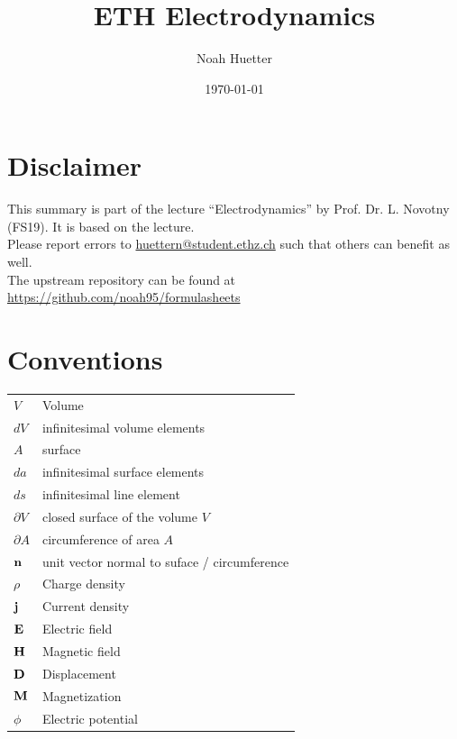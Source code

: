 \documentclass[a4paper, fontsize=8pt, landscape, DIV=1]{scrartcl}
\title{ETH Electrodynamics}
\author{Noah Huetter}
\date{\today}
\begin{document}
\setcounter{secnumdepth}{2} %
\begin{multicols*}{4}
	\section*{Disclaimer}
	This summary is part of the lecture ``Electrodynamics'' by Prof. Dr. L. Novotny (FS19). It is based on the lecture. \\[6pt]
	Please report errors to \href{mailto:huettern@student.ethz.ch}{huettern@student.ethz.ch} such that others can benefit as well.\\[6pt]	
  The upstream repository can be found at \href{https://github.com/noah95/formulasheets}{https://github.com/noah95/formulasheets}
	\vfill\null
	\pagebreak
  \maketitle 
  \thispagestyle{fancy}

  \section{Conventions}
  \begin{tabular}[h]{l l}
    $V$ & Volume \\
    $dV$ & infinitesimal volume elements \\
    $A$ & surface \\
    $da$ & infinitesimal surface elements \\
    $ds$ & infinitesimal line element \\
    $\partial V$ & closed surface of the volume $V$ \\
    $\partial A$ & circumference of area $A$ \\
    $\mathbf{n}$ & unit vector normal to suface / circumference \\
    $\rho$ & Charge density \\
    $\mathbf{j}$ & Current density \\
    $\mathbf{E}$ & Electric field \\
    $\mathbf{H}$ & Magnetic field \\
    $\mathbf{D}$ & Displacement \\
    $\mathbf{M}$ & Magnetization \\
    $\phi$ & Electric potential
  \end{tabular}

\end{multicols*}
\end{document}
